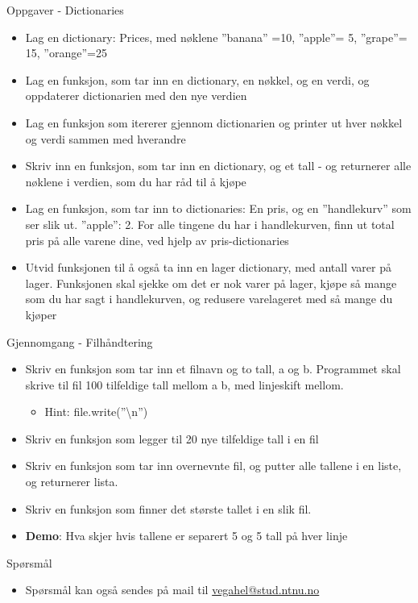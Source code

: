\documentclass[screen, aspectratio=169]{beamer}
\begin{document}
\begin{frame}{Oppgaver - Dictionaries}
	\begin{itemize}
		\item<+-> Lag en dictionary: Prices, med nøklene ''banana'' =10, ''apple''=  5, ''grape''=  15, ''orange''=25 
		
		\item<+-> Lag en funksjon, som tar inn en dictionary, en nøkkel, og en verdi, og oppdaterer dictionarien med den nye verdien
        \item<+-> Lag en funksjon som itererer gjennom dictionarien og printer ut hver nøkkel og verdi sammen med hverandre
		\item<+-> Skriv inn en funksjon, som tar inn en dictionary, og et tall - og returnerer alle nøklene i verdien, som du har råd til å kjøpe
        
		\item<+-> Lag en funksjon, som tar inn to dictionaries: En pris, og en ''handlekurv'' som ser slik ut. {''apple'': 2}. For alle tingene du har i handlekurven, finn ut total pris på alle varene dine, ved hjelp av pris-dictionaries
		

		\item<+-> Utvid funksjonen til å også ta inn en lager dictionary, med antall varer på lager. Funksjonen skal sjekke om det er nok varer på lager, kjøpe så mange som du har sagt i handlekurven, og redusere varelageret med så mange du kjøper

	\end{itemize}
\end{frame}

\begin{frame}{Gjennomgang - Filhåndtering}
	\begin{itemize}
		\item<+-> Skriv en funksjon som tar inn et filnavn og to tall, a og b. Programmet skal skrive til fil 100 tilfeldige tall mellom a  b, med linjeskift mellom. 
		\begin{itemize}
		    \item Hint: file.write(''\textbackslash n'')
		\end{itemize}
		\item<+-> Skriv en funksjon som legger til 20 nye tilfeldige tall i en fil
		\item<+-> Skriv en funksjon som tar inn overnevnte fil, og putter alle tallene i en liste, og returnerer lista.
		\item<+-> Skriv en funksjon som finner det største tallet i en slik fil. 
		\item<+-> \textbf{Demo}: Hva skjer hvis tallene er separert 5 og 5 tall på hver linje
	\end{itemize}
\end{frame}



\begin{frame}{Spørsmål}
	\begin{itemize}
		\item Spørsmål kan også sendes på mail til \href{mailto::vegahel@stud.ntnu.no}{vegahel@stud.ntnu.no}
	\end{itemize}
\end{frame}
\end{document}
